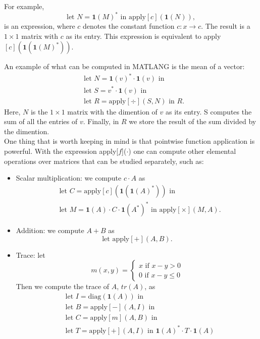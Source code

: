 For example, $$\text{let }N=\mathbf{1}(M)^*\text{ in apply}[c](\mathbf{1}(N)),$$ is an expression, where $c$ denotes the constant function $c:x\rightarrow c$. The result is a $1\times 1$ matrix with $c$ as its entry. This expression is equivalent to apply$[c](\mathbf{1}(\mathbf{1}(M)^*))$.

An example of what can be computed in MATLANG is the mean of a vector:
\begin{align*}
	&\text{let }N=\mathbf{1}(v)^*\cdot\mathbf{1}(v)\text{ in} \\
	&\text{let }S=v^*\cdot\mathbf{1}(v)\text{ in} \\
	&\text{let }R=\text{apply}[\div](S, N)\text{ in } R.
\end{align*}
Here, $N$ is the $1\times 1$ matrix with the dimention of $v$ as its entry. S computes the sum of all the entries of $v$. Finally, in $R$ we store the result of the sum divided by the dimention. \\


One thing that is worth keeping in mind is that pointwise function application is powerful. With the expression apply[$f$]($\cdot$) one can compute other elemental operations over matrices that can be studied separately, such as:
\begin{itemize}
	\item Scalar multiplication: we compute $c\cdot A$ as
		\begin{align*}
			&\text{let }C=\text{apply}[c](\mathbf{1}(\mathbf{1}(A)^*))\text{ in} \\
			&\text{let }M=\mathbf{1}(A)\cdot C\cdot\mathbf{1}(A^*)^*\text{ in apply}[\times](M,A).
		\end{align*}
	\item Addition: we compute $A+B$ as $$\text{let apply}[+](A,B).$$
	\item Trace: let 
		\[
  			m(x, y)=\begin{cases}
               x \text{ if } x-y>0 \\
               0 \text{ if }x-y\leq 0
            \end{cases}
		\]
		Then we compute the trace of $A$, $tr(A)$, as
		\begin{align*}
			&\text{let }I=\text{diag}(\mathbf{1}(A))\text{ in} \\
			&\text{let }B=\text{apply}[-](A, I)\text{ in} \\
			&\text{let }C=\text{apply}[m](A,B)\text{ in} \\
			&\text{let }T=\text{apply}[+](A,I)\text{ in } \mathbf{1}(A)^*\cdot T\cdot\mathbf{1}(A)\\
		\end{align*}
\end{itemize}

